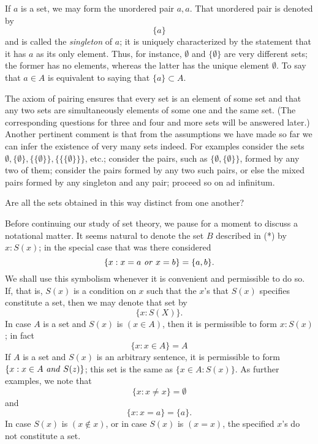 If $a$ is a set, we may form the unordered pair ${a, a}$. That unordered pair is denoted by 
\begin{equation*}
\{ a \}
\end{equation*}
and is called the \textit{singleton} of $a$; it is uniquely characterized by the statement that it has $a$ as its only element. Thus, for instance, $ \emptyset $ and $ \{ \emptyset \}$ are very different sets; the former has no elements, whereas the latter has the unique element $ \emptyset $. To say that $a \in A$ is equivalent to saying that $\{a\} \subset A$. 

The axiom of pairing ensures that every set is an element of some set and that any two sets are simultaneously elements of some one and the same set. (The corresponding questions for three and four and more sets will be answered later.) Another pertinent comment is that from the assumptions we have made so far we can infer the existence of very many sets indeed. For examples  consider the sets $ \emptyset, \{ \emptyset \}, \{ \{ \emptyset \} \}, \{ \{ \{ \emptyset \} \} \} $, etc.; consider the pairs, such as  $ \{ \emptyset, \{ \emptyset \} \}$, formed by any two of them; consider the pairs formed by any two such pairs, or else the mixed pairs formed by any singleton and any pair; proceed so on ad infinitum.

\begin{exercise} Are all the sets obtained in this way distinct from one another? 
\end{exercise}

Before continuing our study of set theory, we pause for a moment to discuss a notational matter. It seems natural to denote the set $B$ described in (*) by ${x: S(x)}$; in the special case that was there considered
\begin{equation*}
\{ x : x = a \text{ \textit{or} } x = b \} = \{ a,b \}.
\end{equation*}
We shall use this symbolism whenever it is convenient and permissible to do so. If, that is, $S(x)$ is a condition on $x$ such that the $x$'s that $S(x)$ specifies constitute a set, then we may denote that set by 
\begin{equation*}
\{ x : S(X) \}.
\end{equation*}
In case $A$ is a set and $S(x)$ is $(x \in A)$, then it is permissible to form ${x: S(x)}$; in fact 
\begin{equation*}
\{ x : x \in A \} = A
\end{equation*}
If $A$ is a set and $S(x)$ is an arbitrary sentence, it is permissible to form $ \{ x : x \in A \text{ \textit{and} } S(z) \}$; this set is the same as $\{x \in A: S(x) \}$. As further examples, we note that 
\begin{equation*}
\{ x : x \neq x \} = \emptyset
\end{equation*}
and
\begin{equation*}
\{ x : x = a \} = \{ a \}.
\end{equation*}
In case $S(x)$ is $(x \notin x)$, or in case $S(x)$ is $(x = x)$, the specified $x$'s do not constitute a set. 

